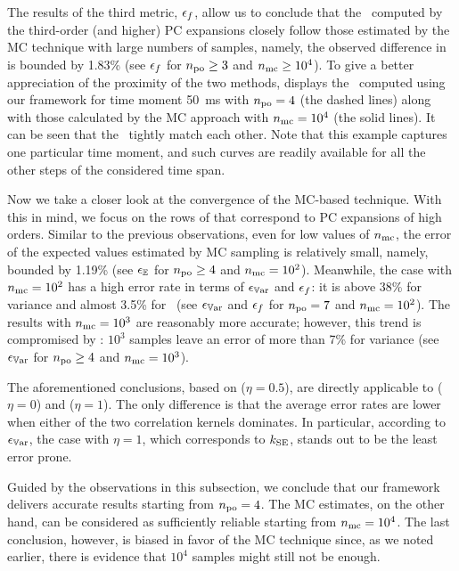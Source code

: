 The results of the third metric, $\epsilon_f$, allow us to conclude that the \pdfs\ computed by the third-order (and higher) PC expansions closely follow those estimated by the MC technique with large numbers of samples, namely, the observed difference in  is bounded by 1.83\% (see $\epsilon_f$ for ${n_\text{po}} \geq 3$ and ${n_\text{mc}} \geq 10^4$).
To give a better appreciation of the proximity of the two methods,  displays the \pdfs\ computed using our framework for time moment 50~ms with ${n_\text{po}} = 4$ (the dashed lines) along with those calculated by the MC approach with ${n_\text{mc}} = 10^4$ (the solid lines).
It can be seen that the \pdfs\ tightly match each other.
Note that this example captures one particular time moment, and such curves are readily available for all the other steps of the considered time span.

Now we take a closer look at the convergence of the MC-based technique.
With this in mind, we focus on the rows of  that correspond to PC expansions of high orders.
Similar to the previous observations, even for low values of ${n_\text{mc}}$, the error of the expected values estimated by MC sampling is relatively small, namely, bounded by 1.19\% (see $\epsilon_\mathbb{E}$ for ${n_\text{po}} \geq 4$ and ${n_\text{mc}} = 10^2$).
Meanwhile, the case with ${n_\text{mc}} = 10^2$ has a high error rate in terms of $\epsilon_{\mathbb{V}\text{ar}}$ and $\epsilon_f$: it is above 38\% for variance and almost 3.5\% for \pdfs\ (see $\epsilon_{\mathbb{V}\text{ar}}$ and $\epsilon_f$ for ${n_\text{po}} = 7$ and ${n_\text{mc}} = 10^2$).
The results with ${n_\text{mc}} = 10^3$ are reasonably more accurate; however, this trend is compromised by : $10^3$ samples leave an error of more than 7\% for variance (see $\epsilon_{\mathbb{V}\text{ar}}$ for ${n_\text{po}} \geq 4$ and ${n_\text{mc}} = 10^3$).

The aforementioned conclusions, based on  ($\eta = 0.5$), are directly applicable to  ($\eta = 0$) and  ($\eta = 1$).
The only difference is that the average error rates are lower when either of the two correlation kernels dominates.
In particular, according to $\epsilon_{\mathbb{V}\text{ar}}$, the case with $\eta = 1$, which corresponds to $k_{\text{SE}}$, stands out to be the least error prone.

Guided by the observations in this subsection, we conclude that our framework delivers accurate results starting from ${n_\text{po}} = 4$.
The MC estimates, on the other hand, can be considered as sufficiently reliable starting from ${n_\text{mc}} = 10^4$.
The last conclusion, however, is biased in favor of the MC technique since, as we noted earlier, there is evidence that $10^4$ samples might still not be enough.
